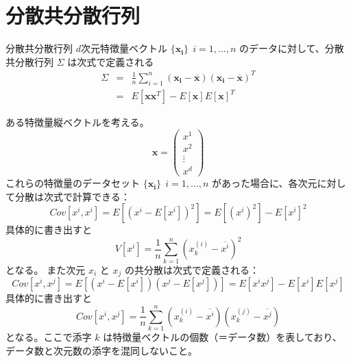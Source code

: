 \documentclass[10pt, a4paper]{ltjsarticle}
\begin{document}
\section{分散共分散行列}

\begin{itembox}[l]{分散共分散行列}
$d$次元特徴量ベクトル $\{\bm{x_i}\}~~i=1,...,n $ のデータに対して、分散共分散行列 $\Sigma$ は次式で定義される
\begin{eqnarray}
  \Sigma &=& \frac{1}{n} \sum_{i=1}^n (\bm{x_i} - \overline{\bm{x}})(\bm{x_i} - \overline{\bm{x}})^T \\ 
   &=& E[\bm{x}\bm{x}^T] - E[\bm{x}]E[\bm{x}]^T
\end{eqnarray}
\end{itembox}

ある特徴量縦ベクトルを考える。
\begin{equation}
  \bm{x} = \begin{pmatrix}
    x^1 \\
    x^2 \\
    \vdots \\
    x^d
  \end{pmatrix}
\end{equation}
これらの特徴量のデータセット $\{\bm{x_i}\}~~i=1,...,n$ があった場合に、各次元に対して分散は次式で計算できる：
\begin{equation}
  Cov[x^i,x^i] = E\left[(x^i-E[x^i])^2\right] = E[(x^i)^2] - E[x^i]^2
\end{equation}
具体的に書き出すと
\begin{equation}
  V[x^i] = \frac{1}{n}\sum_{k=1}^n (x_k^{(i)} - \overline{x^i})^2
\end{equation}
となる。
また次元 $x_i$ と $x_j$ の共分散は次式で定義される：
\begin{equation}
  Cov[x^i,x^j] = E\left[(x^i-E[x^i])(x^j-E[x^j])\right] = E[x^ix^j] - E[x^i]E[x^j]
\end{equation}
具体的に書き出すと
\begin{equation}
  Cov[x^i,x^j] = \frac{1}{n}\sum_{k=1}^n (x_k^{(i)} - \overline{x^i})(x_k^{(j)} - \overline{x^j})
\end{equation}
となる。ここで添字 $k$ は特徴量ベクトルの個数（＝データ数）を表しており、データ数と次元数の添字を混同しないこと。
\end{document}
